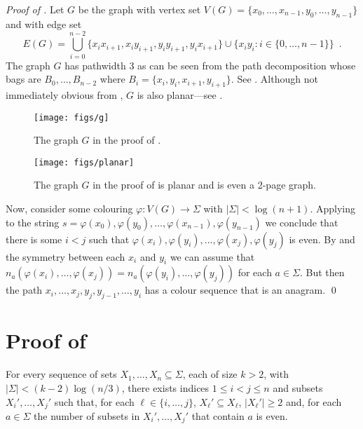 \documentclass{llncs}
\begin{document}
\begin{proof}[Proof of ]
  Let $G$ be the graph with vertex set
  $V(G)=\{x_0,\ldots,x_{n-1},y_0,\ldots,y_{n-1}\}$ and with edge set
  \[
    E(G) = \bigcup_{i=0}^{n-2} \{x_ix_{i+1},x_iy_{i+1},y_iy_{i+1},y_ix_{i+1}\} 
           \cup \{x_iy_i : i\in\{0,\ldots,n-1\}\} \enspace .
  \]
  The graph $G$ has pathwidth 3 as can be seen from the path decomposition
  whose bags are
  $B_0,\ldots,B_{n-2}$ where $B_i=\{x_i,y_i,x_{i+1},y_{i+1}\}$.  See
  . Although not immediately obvious from ,
  $G$ is also planar---see .
  
  \begin{figure}
    \begin{center}
      \texttt{[image: figs/g]}
    \end{center}
    \caption{The graph $G$ in the proof of .}
  \end{figure}
  
  \begin{figure}
    \begin{center}
      \texttt{[image: figs/planar]}
    \end{center}
    \caption{The graph $G$ in the proof of  is planar
     and is even a 2-page graph.}
  \end{figure}
  
  Now, consider some colouring $\varphi:V(G)\to\Sigma$
  with $|\Sigma| < \log(n+1)$.  Applying  to
  the string 
  $s=\varphi(x_0),\varphi(y_0),\ldots,\varphi(x_{n-1}),\varphi(y_{n-1})$ we
  conclude that there is some $i < j$ such that 
  $\varphi(x_{i}),\varphi(y_i),\ldots,\varphi(x_j),\varphi(y_j)$
  is even.  By  and the
  symmetry between each $x_i$ and $y_i$ we can assume that
  $n_a(\varphi(x_i),\ldots,\varphi(x_j))=n_a(\varphi(y_i),\ldots,\varphi(y_j))$
  for each $a\in\Sigma$.  But then the path
  $x_i,\ldots,x_j,y_j,y_{j-1},\ldots,y_i$ has a colour sequence
  that is an anagram.
  \qed
\end{proof}

\section{Proof of }

\begin{lem}
   For every sequence of sets $X_1,\ldots,X_n\subseteq\Sigma$, each of
   size $k>2$, with $|\Sigma|< (k-2)\log(n/3)$, there exists indices
   $1\le i< j\le n$ and subsets $X_i',\ldots,X_j'$ such that, for each
   $\ell\in\{i,\ldots,j\}$,  $X_\ell'\subseteq X_\ell$, $|X_\ell'|\ge 2$
   and, for each $a\in\Sigma$ the number of subsets in $X_i',\ldots,X_j'$
   that contain $a$ is even.
\end{lem}
\end{document}
